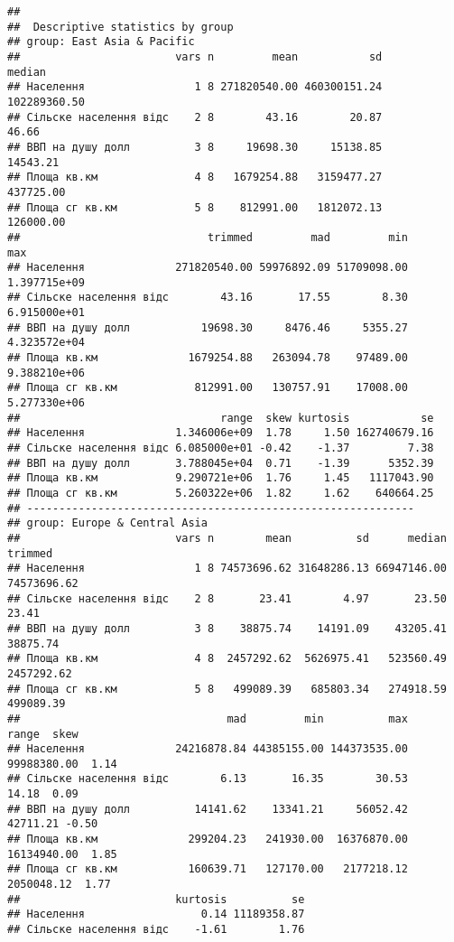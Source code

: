 \documentclass[
]{article}
\begin{document}
\begin{verbatim}
## 
##  Descriptive statistics by group 
## group: East Asia & Pacific
##                        vars n         mean           sd       median
## Населення                 1 8 271820540.00 460300151.24 102289360.50
## Сільске населення відс    2 8        43.16        20.87        46.66
## ВВП на душу долл          3 8     19698.30     15138.85     14543.21
## Площа кв.км               4 8   1679254.88   3159477.27    437725.00
## Площа сг кв.км            5 8    812991.00   1812072.13    126000.00
##                             trimmed         mad         min          max
## Населення              271820540.00 59976892.09 51709098.00 1.397715e+09
## Сільске населення відс        43.16       17.55        8.30 6.915000e+01
## ВВП на душу долл           19698.30     8476.46     5355.27 4.323572e+04
## Площа кв.км              1679254.88   263094.78    97489.00 9.388210e+06
## Площа сг кв.км            812991.00   130757.91    17008.00 5.277330e+06
##                               range  skew kurtosis           se
## Населення              1.346006e+09  1.78     1.50 162740679.16
## Сільске населення відс 6.085000e+01 -0.42    -1.37         7.38
## ВВП на душу долл       3.788045e+04  0.71    -1.39      5352.39
## Площа кв.км            9.290721e+06  1.76     1.45   1117043.90
## Площа сг кв.км         5.260322e+06  1.82     1.62    640664.25
## ------------------------------------------------------------ 
## group: Europe & Central Asia
##                        vars n        mean          sd      median     trimmed
## Населення                 1 8 74573696.62 31648286.13 66947146.00 74573696.62
## Сільске населення відс    2 8       23.41        4.97       23.50       23.41
## ВВП на душу долл          3 8    38875.74    14191.09    43205.41    38875.74
## Площа кв.км               4 8  2457292.62  5626975.41   523560.49  2457292.62
## Площа сг кв.км            5 8   499089.39   685803.34   274918.59   499089.39
##                                mad         min          max       range  skew
## Населення              24216878.84 44385155.00 144373535.00 99988380.00  1.14
## Сільске населення відс        6.13       16.35        30.53       14.18  0.09
## ВВП на душу долл          14141.62    13341.21     56052.42    42711.21 -0.50
## Площа кв.км              299204.23   241930.00  16376870.00 16134940.00  1.85
## Площа сг кв.км           160639.71   127170.00   2177218.12  2050048.12  1.77
##                        kurtosis          se
## Населення                  0.14 11189358.87
## Сільске населення відс    -1.61        1.76

\end{verbatim}
\end{document}
